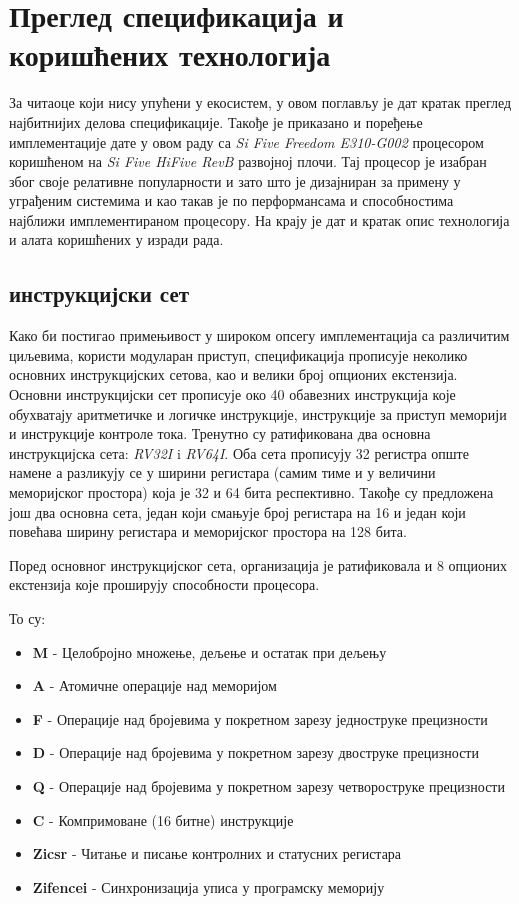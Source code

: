 \chapter{Преглед спецификација и коришћених технологија}

За читаоце који нису упућени у  екосистем, у овом поглављу је дат кратак преглед најбитнијих делова спецификације.
Такође је приказано и поређење имплементације дате у овом раду са \textit{Si Five Freedom E310-G002} процесором коришћеном на \textit{Si Five HiFive RevB}\cite{hifive_site} развојној плочи.
Тај процесор је изабран због своје релативне популарности и зато што је дизајниран за примену у уграђеним системима и као такав је по перформансама и способностима најближи имплементираном процесору.
На крају је дат и кратак опис технологија и алата коришћених у изради рада.

\section{ инструкцијски сет}

Како би постигао примењивост у широком опсегу имплементација са различитим циљевима,  користи модуларан приступ, спецификација\cite{riscv_spec} прописује неколико основних инструкцијских сетова, као и велики број опционих екстензија.
Основни инструкцијски сет прописује око 40 обавезних инструкција које обухватају аритметичке и логичке инструкције, инструкције за приступ меморији и инструкције контроле тока.
Тренутно су ратификована два основна инструкцијска сета: \textit{RV32I} i \textit{RV64I}. Оба сета прописују 32 регистра опште намене а разликују се у ширини регистара (самим тиме и у величини меморијског простора) која је 32 и 64 бита респективно. Такође су предложена још два основна сета, један који смањује број регистара на 16 и један који повећава ширину регистара и меморијског простора на 128 бита.

Поред основног инструкцијског сета,  организација је ратификовала и 8 опционих екстензија које проширују способности процесора.

То су:
\begin{itemize}
	\item \textbf{M} - Целобројно множење, дељење и остатак при дељењу
	\item \textbf{A} - Атомичне операције над меморијом
	\item \textbf{F} - Операције над бројевима у покретном зарезу једноструке прецизности
	\item \textbf{D} - Операције над бројевима у покретном зарезу двоструке прецизности
	\item \textbf{Q} - Операције над бројевима у покретном зарезу четвороструке прецизности
	\item \textbf{C} - Компримоване (16 битне) инструкције
	\item \textbf{Zicsr} - Читање и писање контролних и статусних регистара
	\item \textbf{Zifencei} - Синхронизација уписа у програмску меморију
\end{itemize}

